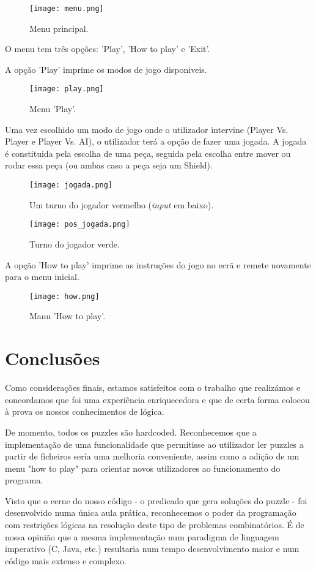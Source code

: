 \documentclass[a4paper]{article}
\begin{document}
\begin{figure}
\caption{Menu principal.}
\centering
\texttt{[image: menu.png]}
\end{figure}

O menu tem três opções: 'Play', 'How to play' e 'Exit'.

A opção 'Play' imprime os modos de jogo disponiveis.

\begin{figure}
\caption{Menu 'Play'.}
\centering
\texttt{[image: play.png]}
\end{figure}

Uma vez escolhido um modo de jogo onde o utilizador intervine (Player Vs. Player e Player Vs. AI), o utilizador terá a opção de fazer uma jogada.
A jogada é constituida pela escolha de uma peça, seguida pela escolha entre mover ou rodar essa peça (ou ambas caso a peça seja um Shield).

\begin{figure}
\caption{Um turno do jogador vermelho (\textit{input} em baixo).}
\centering
\texttt{[image: jogada.png]}
\end{figure}

\begin{figure}
\caption{Turno do jogador verde.}
\centering
\texttt{[image: pos\_jogada.png]}
\end{figure}

A opção 'How to play' imprime as instruções do jogo no ecrã e remete novamente para o menu inicial.

\begin{figure}
\caption{Manu 'How to play'.}
\centering
\texttt{[image: how.png]}
\end{figure}



\section{Conclusões}
Como considerações finais, estamos satisfeitos com o trabalho que realizámos e concordamos que foi uma experiência enriquecedora e que de certa forma colocou à prova os nossos conhecimentos de lógica.

De momento, todos os puzzles são hardcoded. Reconhecemos que a implementação de uma funcionalidade que permitisse ao utilizador ler puzzles a partir de ficheiros sería uma melhoria conveniente, assim como a adição de um menu "how to play" para orientar novos utilizadores ao funcionamento do programa.

Visto que o cerne do nosso código - o predicado que gera soluções do puzzle - foi desenvolvido numa única aula prática, reconhecemos o poder da programação com restrições lógicas na resolução deste tipo de problemas combinatórios. É de nossa opinião que a mesma implementação num paradigma de linguagem imperativo (C, Java, etc.) resultaria num tempo desenvolvimento maior e num código mais extenso e complexo.

\end{document}
